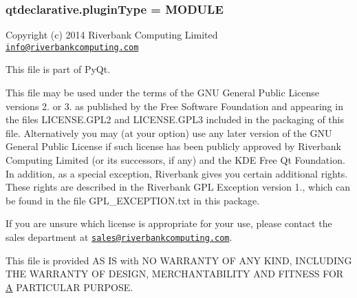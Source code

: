 \subsubsection[{plugin\+Type}]{\setlength{\rightskip}{0pt plus 5cm}qtdeclarative.\+plugin\+Type = M\+O\+D\+U\+L\+E}\label{namespaceqtdeclarative_a210fe233cef6507e2297ccd6c450c52a}


Copyright (c) 2014 Riverbank Computing Limited \href{mailto:info@riverbankcomputing.com}{\tt info@riverbankcomputing.\+com} 

This file is part of Py\+Qt.

This file may be used under the terms of the G\+N\+U General Public License versions 2. or 3. as published by the Free Software Foundation and appearing in the files L\+I\+C\+E\+N\+S\+E.\+G\+P\+L2 and L\+I\+C\+E\+N\+S\+E.\+G\+P\+L3 included in the packaging of this file. Alternatively you may (at your option) use any later version of the G\+N\+U General Public License if such license has been publicly approved by Riverbank Computing Limited (or its successors, if any) and the K\+D\+E Free Qt Foundation. In addition, as a special exception, Riverbank gives you certain additional rights. These rights are described in the Riverbank G\+P\+L Exception version 1., which can be found in the file G\+P\+L\+\_\+\+E\+X\+C\+E\+P\+T\+I\+O\+N.\+txt in this package.

If you are unsure which license is appropriate for your use, please contact the sales department at \href{mailto:sales@riverbankcomputing.com}{\tt sales@riverbankcomputing.\+com}.

This file is provided A\+S I\+S with N\+O W\+A\+R\+R\+A\+N\+T\+Y O\+F A\+N\+Y K\+I\+N\+D, I\+N\+C\+L\+U\+D\+I\+N\+G T\+H\+E W\+A\+R\+R\+A\+N\+T\+Y O\+F D\+E\+S\+I\+G\+N, M\+E\+R\+C\+H\+A\+N\+T\+A\+B\+I\+L\+I\+T\+Y A\+N\+D F\+I\+T\+N\+E\+S\+S F\+O\+R \hyperlink{classA}{A} P\+A\+R\+T\+I\+C\+U\+L\+A\+R P\+U\+R\+P\+O\+S\+E. 